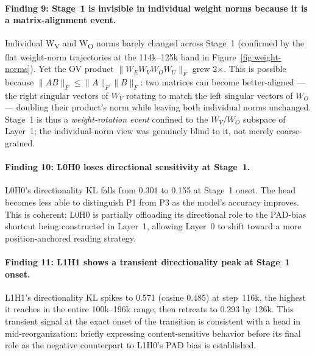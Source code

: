 \documentclass[11pt, a4paper]{article}
\begin{document}
\paragraph{Finding 9: Stage~1 is invisible in individual weight norms because
it is a matrix-alignment event.}
Individual W\textsubscript{V} and W\textsubscript{O} norms barely changed across
Stage~1 (confirmed by the flat weight-norm trajectories at the 114k--125k band in
Figure~\ref{fig:weight-norms}).  Yet the OV product
$\|W_{E} W_V W_O W_U\|_F$ grew 2$\times$.  This is possible because
$\|AB\|_F \leq \|A\|_F\|B\|_F$: two matrices can become better-aligned ---
the right singular vectors of $W_V$ rotating to match the left singular vectors
of $W_O$ --- doubling their product's norm while leaving both individual norms
unchanged.  Stage~1 is thus a \emph{weight-rotation event} confined to the
$W_V$/$W_O$ subspace of Layer~1; the individual-norm view was genuinely blind to
it, not merely coarse-grained.

\paragraph{Finding 10: L0H0 loses directional sensitivity at Stage~1.}
L0H0's directionality KL falls from 0.301 to 0.155 at Stage~1 onset.  The head
becomes less able to distinguish P1 from P3 as the model's accuracy improves.
This is coherent: L0H0 is partially offloading its directional role to the
PAD-bias shortcut being constructed in Layer~1, allowing Layer~0 to shift
toward a more position-anchored reading strategy.

\paragraph{Finding 11: L1H1 shows a transient directionality peak at Stage~1
onset.}
L1H1's directionality KL spikes to 0.571 (cosine 0.485) at step~116k, the
highest it reaches in the entire 100k--196k range, then retreats to 0.293 by
126k.  This transient signal at the exact onset of the transition is consistent
with a head in mid-reorganization: briefly expressing content-sensitive behavior
before its final role as the negative counterpart to L1H0's PAD bias is
established.
\end{document}
